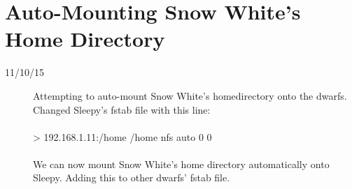 \section{Auto-Mounting Snow White's Home Directory}
\begin{description}
\item [11/10/15] Attempting to auto-mount Snow White's homedirectory onto the dwarfs. Changed Sleepy's fstab file with this line: \\ \\
> 192.168.1.11:/home /home nfs auto 0 0 \\ \\
We can now mount Snow White's home directory automatically onto Sleepy. Adding this to other dwarfs' fstab file.
\end{description}

